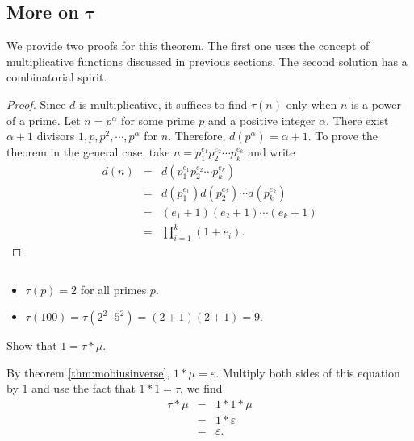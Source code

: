 \documentclass[12pt]{subfile}
\begin{document}
\subsection{More on \texorpdfstring{$\boldsymbol{\tau}$}{\texttau(n)}}\label{sec:d(n)}

We provide two proofs for this theorem. The first one uses the concept of multiplicative functions discussed in previous sections. The second solution has a combinatorial spirit.

	\begin{proof}
		Since $d$ is multiplicative, it suffices to find $\tau(n)$ only when $n$ is a power of a prime. Let $n=p^\alpha$ for some prime $p$ and a positive integer $\alpha$. There exist $\alpha+1$ divisors $1, p, p^2, \cdots, p^\alpha$ for $n$. Therefore, $d(p^\alpha)=\alpha + 1$. To prove the theorem in the general case, take $n=p_1^{e_1}p_2^{e_2}\cdots p_k^{e_k}$ and write
			\begin{eqnarray*}
				d(n) &=& d(p_1^{e_1}p_2^{e_2}\cdots p_k^{e_k})\\
					 &=& d(p_1^{e_1}) d(p_2^{e_2})\cdots d(p_k^{e_k})\\
					 &=& (e_1+1)(e_2+1)\cdots (e_k+1)\\
					 &=& \prod_{i=1}^{k} (1+e_i).
			\end{eqnarray*}
	\end{proof}

	\begin{example}
		$ $
		\begin{itemize}
			\item $\tau(p)=2$ for all primes $p$.
			\item $\tau(100) = \tau(2^2 \cdot 5^2) = (2+1)(2+1)=9$.
		\end{itemize}
	\end{example}



	\begin{problem}
		Show that $1 = \tau \ast \mu$.
	\end{problem}

	\begin{solution}
		By theorem \ref{thm:mobiusinverse}, $1 \ast \mu =\varepsilon$. Multiply both sides of this equation by $1$ and use the fact that $1\ast 1 = \tau$, we find
			\begin{eqnarray*}
				\tau \ast \mu &=& 1 \ast 1 \ast \mu \\
							  &=& 1 \ast \varepsilon\\
							  &=& \varepsilon.
			\end{eqnarray*}
	\end{solution}
\end{document}
